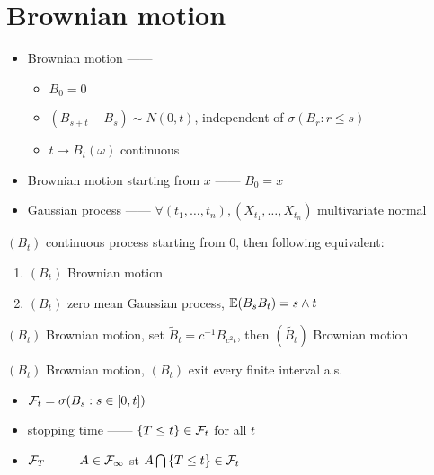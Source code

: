 \section{Brownian motion}\label{sec:brownian-motion}

\begin{itemize}
    \item Brownian motion ------
    \begin{itemize}
        \item $B_0 = 0$
        \item $(B_{s+t} - B_s) \sim N(0, t)$, independent of $\sigma(B_r: r \leq s)$
        \item $t \mapsto B_t(\omega)$ continuous
    \end{itemize}
    \item Brownian motion starting from $x$ ------ $B_0 = x$
    \item Gaussian process ------ $\forall (t_1, \dots, t_n), (X_{t_1}, \dots, X_{t_n})$ multivariate normal
\end{itemize}

\begin{prop}
    $(B_t)$ continuous process starting from 0, then following equivalent:
    \begin{enumerate}
        \item $(B_t)$ Brownian motion
        \item $(B_t)$ zero mean Gaussian process, $\mathbb{E}(B_s B_t) = s \wedge t$
    \end{enumerate}
\end{prop}

\begin{prop}
    $(B_t)$ Brownian motion, set $\tilde B_t = c^{-1}B_{c^2 t}$, then $(\tilde{B_t})$ Brownian motion
\end{prop}

\begin{prop}
    $(B_t)$ Brownian motion, $(B_t)$ exit every finite interval a.s.\
\end{prop}

\begin{itemize}
    \item $\mathcal{F}_t = \sigma(B_s : s \in [0, t])$
    \item stopping time ------ $\left\{ T \leq t \right\} \in \mathcal{F}_t$ for all $t$
    \item $\mathcal{F}_T$ ------ $A \in \mathcal{F}_{\infty}$ st $A \bigcap \left\{ T \leq t \right\} \in \mathcal{F}_t$
\end{itemize}

